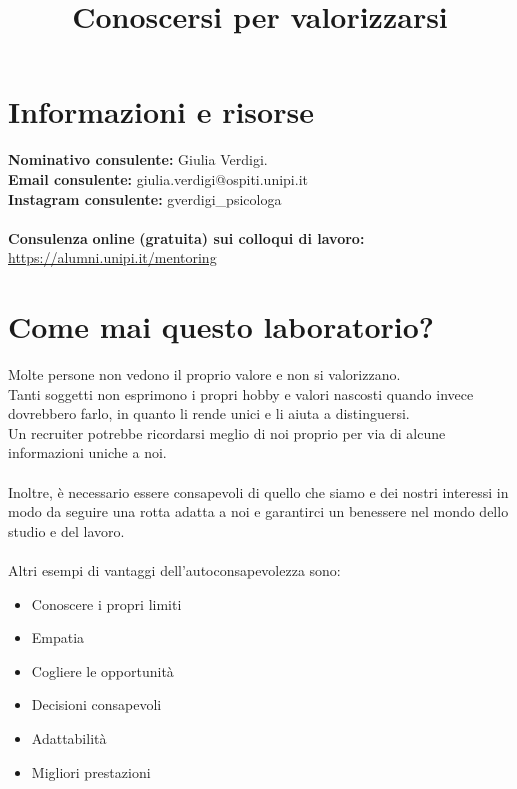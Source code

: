 \documentclass[12pt,a4paper]{article}
\title{Conoscersi per valorizzarsi}
\author{}
\date{}
\let\oldsection\section
\renewcommand{\section}{\clearpage\oldsection}
\begin{document}
\maketitle
\tableofcontents

\section{Informazioni e risorse}
\textbf{Nominativo consulente:} Giulia Verdigi.\\
\textbf{Email consulente:} giulia.verdigi@ospiti.unipi.it\\
\textbf{Instagram consulente:} gverdigi\_psicologa\\\\
\textbf{Consulenza} \textbf{online} \textbf{(gratuita) sui colloqui di lavoro:}
\href{https://alumni.unipi.it/mentoring}{https://alumni.unipi.it/mentoring}

\section{Come mai questo laboratorio?}
Molte persone non vedono il proprio valore e non si valorizzano.\\
Tanti soggetti non esprimono i propri hobby e valori nascosti quando invece dovrebbero farlo, in quanto li rende unici e li aiuta a distinguersi.\\
Un recruiter potrebbe ricordarsi meglio di noi proprio per via di alcune informazioni uniche a noi.\\\\
Inoltre, è necessario essere consapevoli di quello che siamo e dei nostri interessi in modo da seguire una rotta adatta a noi e garantirci un benessere nel mondo dello studio e del lavoro.\\\\
Altri esempi di vantaggi dell'autoconsapevolezza sono:
\begin{itemize}
  \item Conoscere i propri limiti
  \item Empatia
  \item Cogliere le opportunità
  \item Decisioni consapevoli
  \item Adattabilità
  \item Migliori prestazioni
\end{itemize}
\end{document}
